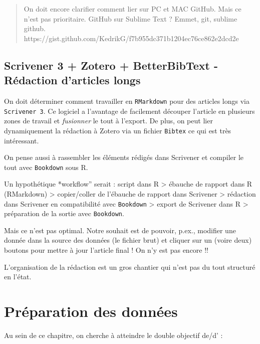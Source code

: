 \documentclass[
  letterpaper,
  DIV=11,
  numbers=noendperiod]{scrreprt}
\begin{document}
\begin{quote}
On doit encore clarifier comment lier sur PC et MAC GitHub. Mais ce
n'est pas prioritaire. GitHub sur Sublime Text ? Emmet, git, sublime
github. https://gist.github.com/KedrikG/f7b955dc371b1204ec76ce862e2dcd2e
\end{quote}

\hypertarget{scrivener-3-zotero-betterbibtext---ruxe9daction-darticles-longs}{%
\section{Scrivener 3 + Zotero + BetterBibText - Rédaction d'articles
longs}\label{scrivener-3-zotero-betterbibtext---ruxe9daction-darticles-longs}}

On doit déterminer comment travailler en \texttt{RMarkdown} pour des
articles longs via \texttt{Scrivener\ 3}. Ce logiciel a l'avantage de
facilement découper l'article en plusieurs zones de travail et
\emph{fusionner} le tout à l'export. De plus, on peut lier dynamiquement
la rédaction à Zotero via un fichier \texttt{Bibtex} ce qui est très
intéressant.

On pense aussi à rassembler les éléments rédigés dans Scrivener et
compiler le tout avec \texttt{Bookdown} sous R.

Un hypothétique *workflow'' serait : script dans R \textgreater{}
ébauche de rapport dans R (RMarkdown) \textgreater{} copier/coller de
l'ébauche de rapport dans Scrivener \textgreater{} rédaction dans
Scrivener en compatibilité avec \texttt{Bookdown} \textgreater{} export
de Scrivener dans R \textgreater{} préparation de la sortie avec
\texttt{Bookdown}.

Mais ce n'est pas optimal. Notre souhait est de pouvoir, p.ex., modifier
une donnée dans la source des données (le fichier brut) et cliquer sur
un (voire deux) boutons pour mettre à jour l'article final ! On n'y est
pas encore !!

L'organisation de la rédaction est un gros chantier qui n'est pas du
tout structuré en l'état.


\hypertarget{pruxe9paration-des-donnuxe9es}{%
\chapter{Préparation des données}\label{pruxe9paration-des-donnuxe9es}}

Au sein de ce chapitre, on cherche à atteindre le double objectif de/d'
:
\end{document}
